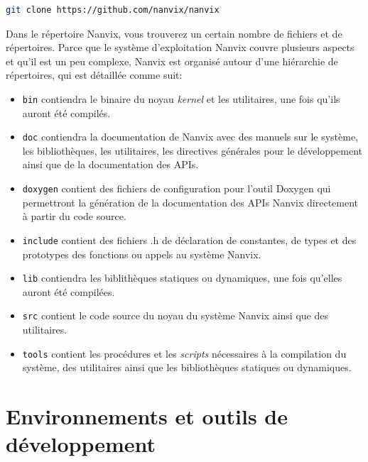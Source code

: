 \documentclass[11pt]{article}
\begin{document}
\begin{lstlisting}[language=bash,numbers=none,frame=single]
git clone https://github.com/nanvix/nanvix
\end{lstlisting}

\vspace{0.3cm}

Dans le répertoire Nanvix, vous trouverez un certain nombre de
fichiers et de répertoires. Parce que le système d'exploitation Nanvix
couvre plusieurs aspects et qu'il est un peu complexe, Nanvix est
organisé autour d'une hiérarchie de répertoires, qui est détaillée
comme suit:

\begin{itemize}
\item \texttt{bin} contiendra le binaire du noyau \textit{kernel} et les
  utilitaires, une fois qu'ils auront été compilés.
  
\item \texttt{doc} contiendra la documentation de Nanvix avec des
  manuels sur le système, les bibliothèques, les utilitaires, les
  directives générales pour le développement ainsi que de la
  documentation des APIs.
  
\item \texttt{doxygen} contient des fichiers de configuration pour
  l'outil Doxygen qui permettront la génération de la documentation
  des APIs Nanvix directement à partir du code source.
  
\item \texttt{include} contient des fichiers .h de déclaration de
  constantes, de types et des prototypes des fonctions ou appels au
  système Nanvix.
  
\item \texttt{lib} contiendra les biblithèques statiques ou dynamiques,
  une fois qu'elles auront été compilées.
  
\item \texttt{src} contient le code source du noyau du système Nanvix
  ainsi que des utilitaires.
  
\item \texttt{tools} contient les procédures et les \textit{scripts}
  nécessaires à la compilation du système, des utilitaires ainsi que
  les bibliothèques statiques ou dynamiques.
\end{itemize}

\section{Environnements et outils de développement}
\label{sec:tools}
\end{document}
